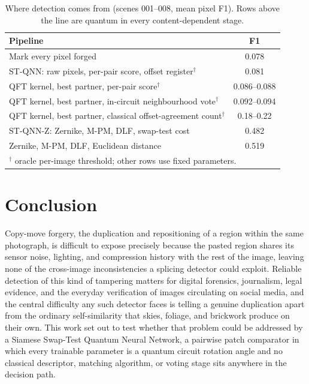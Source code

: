 \documentclass[conference]{IEEEtran}
\begin{document}
\begin{table}[t]
\centering
\caption{Where detection comes from (scenes 001--008, mean pixel F1). Rows above the line are quantum in every content-dependent stage.}
\label{tab:story}
\setlength{\tabcolsep}{3pt}
\begin{tabular}{lc}
\toprule
\textbf{Pipeline} & \textbf{F1}\\
\midrule
Mark every pixel forged & 0.078\\
ST-QNN: raw pixels, per-pair score, offset register$^\dagger$ & 0.081\\
QFT kernel, best partner, per-pair score$^\dagger$ & 0.086--0.088\\
QFT kernel, best partner, in-circuit neighbourhood vote$^\dagger$ & 0.092--0.094\\
\midrule
QFT kernel, best partner, classical offset-agreement count$^\dagger$ & 0.18--0.22\\
ST-QNN-Z: Zernike, M-PM, DLF, swap-test cost & 0.482\\
Zernike, M-PM, DLF, Euclidean distance~\cite{cozzolino2015} & 0.519\\
\bottomrule
\multicolumn{2}{l}{\footnotesize $^\dagger$ oracle per-image threshold; other rows use fixed parameters.}
\end{tabular}
\end{table}

\section{Conclusion}\label{sec:conclusion}
Copy-move forgery, the duplication and repositioning of a region within the same photograph, is difficult to expose precisely because the pasted region shares its sensor noise, lighting, and compression history with the rest of the image, leaving none of the cross-image inconsistencies a splicing detector could exploit. Reliable detection of this kind of tampering matters for digital forensics, journalism, legal evidence, and the everyday verification of images circulating on social media, and the central difficulty any such detector faces is telling a genuine duplication apart from the ordinary self-similarity that skies, foliage, and brickwork produce on their own. This work set out to test whether that problem could be addressed by a Siamese Swap-Test Quantum Neural Network, a pairwise patch comparator in which every trainable parameter is a quantum circuit rotation angle and no classical descriptor, matching algorithm, or voting stage sits anywhere in the decision path.
\end{document}
